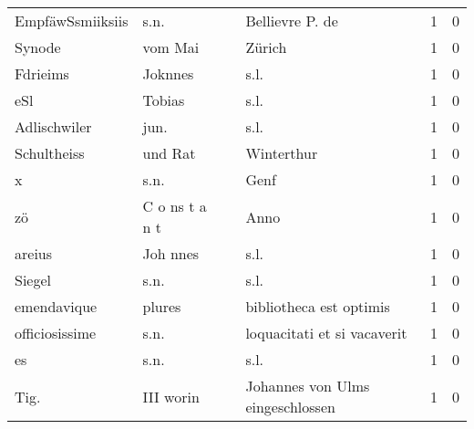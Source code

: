 \begin{tabular}{llllrr}
         EmpfäwSsmiiksiis &                               s.n. &             &                             Bellievre P. de &          1 &         0 \\
                   Synode &                            vom Mai &             &                                      Zürich &          1 &         0 \\
                 Fdrieims &                            Joknnes &             &                                        s.l. &          1 &         0 \\
                      eSl &                             Tobias &             &                                        s.l. &          1 &         0 \\
             Adlischwiler &                               jun. &             &                                        s.l. &          1 &         0 \\
              Schultheiss &                            und Rat &             &                                  Winterthur &          1 &         0 \\
                        x &                               s.n. &             &                                        Genf &          1 &         0 \\
                       zö &                     C o ns t a n t &             &                                        Anno &          1 &         0 \\
                   areius &                           Joh nnes &             &                                        s.l. &          1 &         0 \\
                   Siegel &                               s.n. &             &                                        s.l. &          1 &         0 \\
              emendavique &                             plures &             &                     bibliotheca est optimis &          1 &         0 \\
           officiosissime &                               s.n. &             &                 loquacitati et si vacaverit &          1 &         0 \\
                       es &                               s.n. &             &                                        s.l. &          1 &         0 \\
                     Tig. &                          III worin &             &            Johannes von Ulms eingeschlossen &          1 &         0 \\

\end{tabular}

